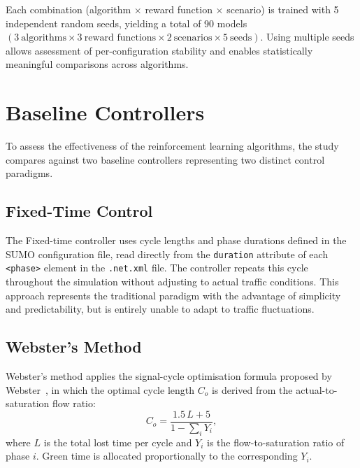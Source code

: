 Each combination (algorithm $\times$ reward function $\times$ scenario) is
trained with 5 independent random seeds, yielding a total of 90 models
$(3\ \text{algorithms} \times 3\ \text{reward functions} \times
2\ \text{scenarios} \times 5\ \text{seeds})$.
Using multiple seeds allows assessment of per-configuration stability and
enables statistically meaningful comparisons across algorithms.

\section{Baseline Controllers}

To assess the effectiveness of the reinforcement learning algorithms, the study
compares against two baseline controllers representing two distinct control
paradigms.

\subsection{Fixed-Time Control}

The Fixed-time controller uses cycle lengths and phase durations defined in the
SUMO configuration file, read directly from the \texttt{duration} attribute of
each \texttt{<phase>} element in the \texttt{.net.xml} file. The controller
repeats this cycle throughout the simulation without adjusting to actual traffic
conditions. This approach represents the traditional paradigm with the
advantage of simplicity and predictability, but is entirely unable to adapt to
traffic fluctuations.

\subsection{Webster's Method}

Webster's method applies the signal-cycle optimisation formula proposed by
Webster~\cite{webster1958}, in which the optimal cycle length $C_o$ is derived
from the actual-to-saturation flow ratio:
\begin{equation}
    C_o = \frac{1.5\,L + 5}{1 - \sum_i Y_i},
\end{equation}
where $L$ is the total lost time per cycle and $Y_i$ is the flow-to-saturation
ratio of phase $i$. Green time is allocated proportionally to the corresponding
$Y_i$.


